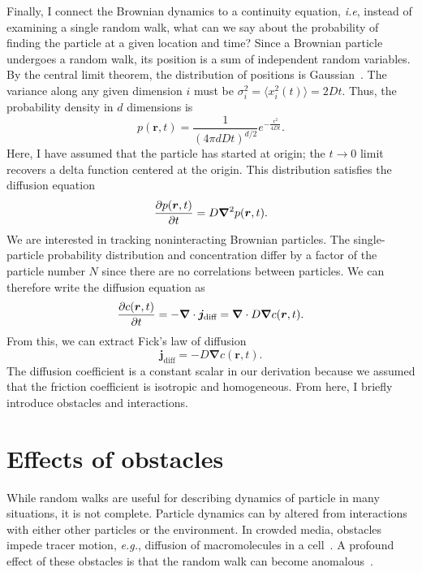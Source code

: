 Finally, I connect the Brownian dynamics to a continuity
equation, \textit{i.e}, instead of examining a single random walk, what can we
say about the probability of finding the particle at a given location and time?
Since a Brownian particle undergoes a random walk, its position is a sum of
independent random variables.  By the central limit theorem, the distribution of
positions is Gaussian~\cite{doi_theory_88}.  The variance along any given
dimension $i$ must be $ \sigma_i^2 = \langle x_i^2(t) \rangle = 2Dt $.  Thus,
the probability density in $d$ dimensions is
%
\begin{equation}
  p(\bm{r},t) = 
  \frac{1}{{(4 \pi d D t)}^{d/2}} e ^ {-\frac{r^2}{4Dt}}.
\end{equation}
%
Here, I have assumed that the particle has started at origin; the $t
\rightarrow 0$ limit recovers a delta function centered at the origin.  This
distribution satisfies the diffusion equation
%
\begin{equation}
  \frac{\partial p(\bm{r},t)}{\partial t} = D \bm{\nabla} ^2 p(\bm{r},t).
\end{equation}
%
We are interested in tracking noninteracting Brownian particles.  The
single-particle probability distribution and concentration differ by a factor of
the particle number $N$ since there are no correlations between particles.  We
can therefore write the diffusion equation as
%
\begin{equation}
  \label{eqn:smoluchowski_diff}
  \frac{\partial c(\bm{r},t)}{\partial t}
  = -\bm{\nabla} \cdot \bm{j}_{\text{diff}}
  = \bm{\nabla} \cdot D \bm{\nabla} c(\bm{r},t).
\end{equation}
%
From this,  we can extract Fick's law of diffusion~\cite{doi_theory_88}
%
\begin{equation}
  \bm{j}_{\text{diff}} = -D \bm{\nabla} c(\bm{r},t).
\end{equation}
%
The diffusion coefficient is a constant scalar in our derivation because we
assumed that the friction coefficient is isotropic and homogeneous.  From here,
I briefly introduce obstacles and interactions.

\section{Effects of obstacles}

While random walks are useful for describing dynamics of particle in many
situations, it is not complete.  Particle dynamics can by altered from
interactions with either other particles or the environment.  In crowded media,
obstacles impede tracer motion, \textit{e.g.}, diffusion of macromolecules in a
cell~\cite{hofling_anomalous_13}.  A profound effect of these obstacles is that
the random walk can become anomalous~\cite{metzler_random_00}.

